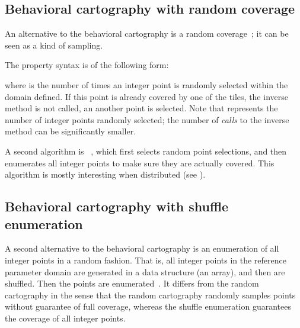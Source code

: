 


\subsection*{Behavioral cartography with random coverage}\label{sss:mode:BC:random}

An alternative to the behavioral cartography is a random coverage~\cite{AF10}; it can be seen as a kind of sampling.

The property syntax is of the following form:



\noindent{}where  is the number of times an integer point is randomly selected within the domain defined.
If this point is already covered by one of the tiles, the inverse method is not called, an another point is selected.
Note that  represents the number of integer points randomly selected; the number of \emph{calls} to the inverse method can be significantly smaller.

A second algorithm is ~\cite{ACE14}, which first selects random point selections, and then enumerates all integer points to make sure they are actually covered.
This algorithm is mostly interesting when distributed (see \cite{ACE14,ACN15}).


\subsection*{Behavioral cartography with shuffle enumeration}\label{sss:mode:BC:shuffle}

A second alternative to the behavioral cartography is an enumeration of all integer points in a random fashion.
That is, all integer points in the reference parameter domain are generated in a data structure (an array), and then are shuffled.
Then the points are enumerated~\cite{ACN15}.
It differs from the random cartography in the sense that the random cartography randomly samples points without guarantee of full coverage, whereas the shuffle enumeration guarantees the coverage of all integer points.

